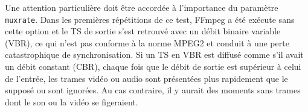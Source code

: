 \documentclass[12pt,a4paper]{article}
\begin{document}



Une attention particulière doit être accordée à l'importance du paramètre \texttt{muxrate}. Dans les premières répétitions de ce test, FFmpeg a été exécute sans cette option et le TS de sortie s'est retrouvé avec un débit binaire variable (VBR), ce qui n'est pas conforme à la norme MPEG2 et conduit à une perte catastrophique de synchronisation. Si un TS en VBR est diffusé comme s'il avait un débit constant (CBR), chaque fois que le débit de sortie est supérieur à celui de l'entrée, les trames vidéo ou audio sont présentées plus rapidement que le supposé ou sont ignorées. Au cas contraire, il y aurait des moments sans trames dont le son ou la vidéo se figeraient.

\end{document}
